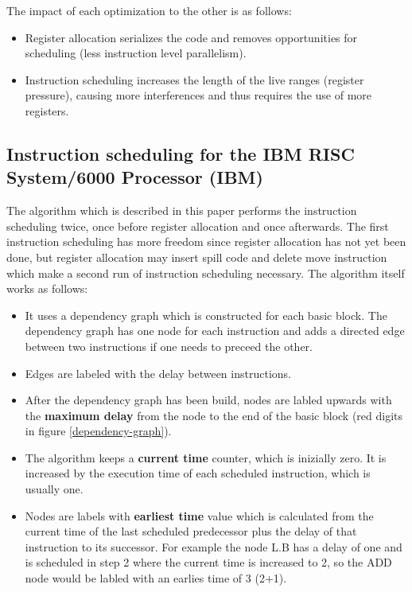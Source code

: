 \documentclass[a4paper,10pt]{article}
\begin{document}
The impact of each optimization to the other is as follows:
\begin{itemize}
 \item Register allocation serializes the code and removes opportunities for scheduling (less instruction level parallelism).
 \item Instruction scheduling increases the length of the live ranges (register pressure), causing more interferences and thus requires the use of more registers.
\end{itemize}

\subsection{Instruction scheduling for the IBM RISC System/6000 Processor (IBM)}
The algorithm which is described in this paper performs the instruction scheduling twice, once before register allocation and once
afterwards. The first instruction scheduling has more freedom since register allocation has not yet been done, but register allocation
may insert spill code and delete move instruction which make a second run of instruction scheduling necessary. The algorithm itself works
as follows:
\begin{itemize}
 \item It uses a dependency graph which is constructed for each basic block. The dependency graph has one node for each instruction and
       adds a directed edge between two instructions if one needs to preceed the other.
 \item Edges are labeled with the delay between instructions.
 \item After the dependency graph has been build, nodes are labled upwards with the \textbf{maximum delay} from the node to the end of the 
       basic block (red digits in figure \ref{dependency-graph}).
 \item The algorithm keeps a \textbf{current time} counter, which is inizially zero. It is increased by the execution time of each 
       scheduled instruction, which is usually one.
 \item Nodes are labels with \textbf{earliest time} value which is calculated from the current time of the last scheduled predecessor plus 
       the delay of that instruction to its successor. For example the node L.B has a delay of one and is scheduled in step 2 where the 
       current time is increased to 2, so the ADD node would be labled with an earlies time of 3 (2+1).
\end{itemize}
\end{document}
